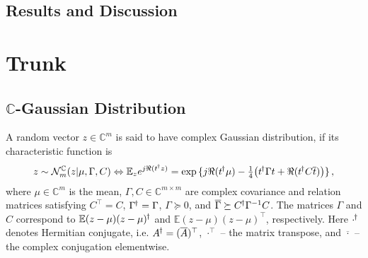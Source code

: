 \documentclass[a4paper,10pt]{article}
\newcommand{\cplx}{\mathbb{C}}
\newcommand{\hop}{{\mkern-1.5mu\dagger}}
\newcommand{\conj}[1]{\overline{#1}}
\begin{document}
\cite{monning_evaluation_2018}
\cite{jankowski_complex-valued_1996}
\cite{amin_complex-valued_2012}
\cite{sarroff_complex_2018}


\subsection{Results and Discussion} %
\label{sub:results_and_discussion}



\section{Trunk} %
\label{sec:trunk}

\subsection{$\cplx$-Gaussian Distribution} %
\label{sub:c_gaussian_distribution}

A random vector $z\in \cplx^m$ is said to have complex Gaussian distribution, if its characteristic
function is
$$
z \sim \mathcal{N}^{\cplx}_m(z \vert \mu, \Gamma, C)
  \Leftrightarrow
  \mathbb{E}_{z} e^{j \Re{(t^{\hop} z)}}
  = \exp{\{
    j \Re{(t^{\hop} \mu)}
    - \tfrac14 \bigl(
      t^{\hop} \Gamma t + \Re{(t^{\hop} C \conj{t})}
    \bigr)
  \}}
  \,, $$
where $\mu \in \cplx^m$ is the mean, $\Gamma, C \in \cplx^{m\times m}$ are complex covariance
and relation matrices satisfying $C^\top = C$, $\Gamma^{\hop} = \Gamma$, $\Gamma \succeq 0$,
and $
  \conj{\Gamma} \succeq C^{\hop} \Gamma^{-1} C
$. The matrices $\Gamma$ and $C$ correspond to $
  \mathbb{E} (z - \mu)(z - \mu)^{\hop}
$ and $
  \mathbb{E} (z - \mu)(z - \mu)^\top
$, respectively. Here ${\cdot}^{\hop}$ denotes Hermitian conjugate, i.e. $
  A^{\hop} = (\conj{A})^\top
$, ${\cdot}^{\top}$ -- the matrix transpose, and $\conj{\cdot}$ -- the complex conjugation
elementwise.
%
\end{document}
